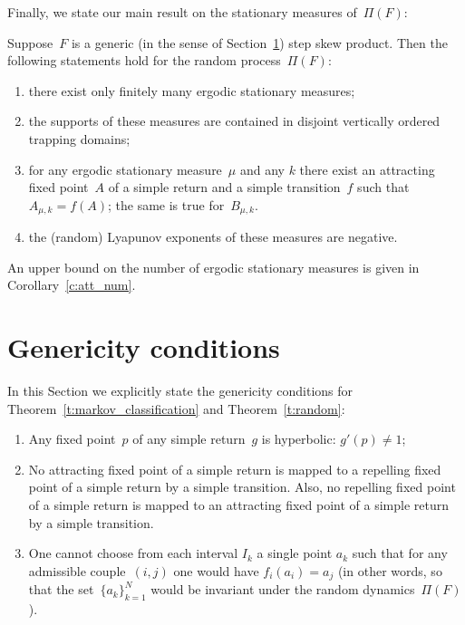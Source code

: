\documentclass[a4paper,12pt]{amsart}
\begin{document}
Finally, we state our main result on the stationary measures of~$\Pi(F)$:
\begin{Thm}\label{t:random}
Suppose~$F$ is a generic (in the sense of Section~\ref{s:typicalness}) step skew product. Then the following statements hold for the random process~$\Pi(F)$:
\begin{enumerate}
\item\label{t:random:1} there exist only finitely many ergodic stationary measures;
\item\label{t:random:2} the supports of these measures are contained in disjoint vertically ordered trapping domains;
\item\label{i:MFixed} for any ergodic stationary measure~$\mu$ and any $k$ there exist an attracting fixed point~$A$ of a simple return and a simple transition~$f$ such that~$A_{\mu,k} = f (A)$; the same is true for~$B_{\mu,k}$.
\item\label{t:random:3} the (random) Lyapunov exponents of these measures are negative.
\end{enumerate}
\end{Thm}

\begin{Rem}
An upper bound on the number of ergodic stationary measures is given in Corollary~\ref{c:att_num}.
\end{Rem}

\section{Genericity conditions}  \label{s:typicalness}

In this Section we explicitly state the genericity conditions for Theorem~\ref{t:markov_classification} and Theorem~\ref{t:random}:

\begin{enumerate}
\item\label{step_typicalnes:1} Any fixed point~$p$ of any simple return~$g$ is hyperbolic: $g'(p) \neq 1$;
\item\label{step_typicalnes:2} No attracting fixed point of a simple return is mapped to a repelling fixed point of a simple return by a simple transition. Also, no repelling fixed point of a simple return is mapped to an attracting fixed point of a simple return by a simple transition.
\item\label{step_typicalnes:3} One cannot choose from each interval $I_k$ a single point $a_k$ such that for any admissible couple~$(i,j)$ one would have $f_i(a_i)=a_j$ (in other words, so that the set~$\{a_k\}_{k=1}^{N}$ would be invariant under the random dynamics~$\Pi(F)$).
\end{enumerate}
\end{document}
